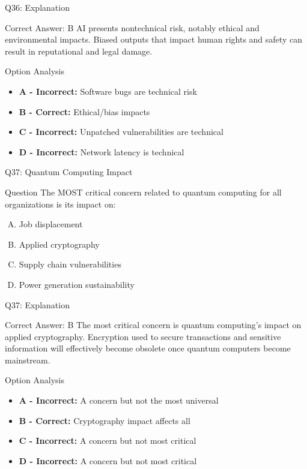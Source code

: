 \documentclass{beamer}
\begin{document}
	\begin{frame}{Q36: Explanation}
		\begin{block}{Correct Answer: B}
			AI presents nontechnical risk, notably ethical and environmental impacts. Biased outputs that impact human rights and safety can result in reputational and legal damage.
		\end{block}
		\begin{block}{Option Analysis}
			\begin{itemize}
				\item \textbf{A - Incorrect:} Software bugs are technical risk
				\item \textbf{B - Correct:} Ethical/bias impacts
				\item \textbf{C - Incorrect:} Unpatched vulnerabilities are technical
				\item \textbf{D - Incorrect:} Network latency is technical
			\end{itemize}
		\end{block}
	\end{frame}
	
	\begin{frame}{Q37: Quantum Computing Impact}
		\begin{block}{Question}
			The MOST critical concern related to quantum computing for all organizations is its impact on:
		\end{block}
		\begin{enumerate}[(A)]
			\item Job displacement
			\item Applied cryptography
			\item Supply chain vulnerabilities
			\item Power generation sustainability
		\end{enumerate}
	\end{frame}
	
	\begin{frame}{Q37: Explanation}
		\begin{block}{Correct Answer: B}
			The most critical concern is quantum computing's impact on applied cryptography. Encryption used to secure transactions and sensitive information will effectively become obsolete once quantum computers become mainstream.
		\end{block}
		\begin{block}{Option Analysis}
			\begin{itemize}
				\item \textbf{A - Incorrect:} A concern but not the most universal
				\item \textbf{B - Correct:} Cryptography impact affects all
				\item \textbf{C - Incorrect:} A concern but not most critical
				\item \textbf{D - Incorrect:} A concern but not most critical
			\end{itemize}
		\end{block}
	\end{frame}
	
\end{document}
